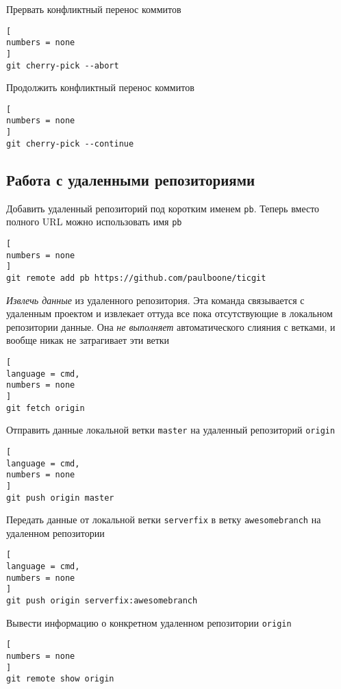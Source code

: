 \documentclass[%
	11pt,
	a4paper,
	utf8,
		]{article}
\begin{document}
Прервать конфликтный перенос коммитов
\begin{lstlisting}[
numbers = none
]
git cherry-pick --abort
\end{lstlisting}

Продолжить конфликтный перенос коммитов
\begin{lstlisting}[
numbers = none
]
git cherry-pick --continue
\end{lstlisting}


\subsection{Работа с удаленными репозиториями}

Добавить удаленный репозиторий под коротким именем \texttt{pb}. Теперь вместо полного URL можно использовать имя \texttt{pb}

\begin{lstlisting}[
numbers = none
]
git remote add pb https://github.com/paulboone/ticgit
\end{lstlisting}


\emph{Извлечь данные} из удаленного репозитория. Эта команда связывается с удаленным проектом и извлекает оттуда все пока отсутствующие в локальном репозитории данные. Она \emph{\color{red}не выполняет} автоматического слияния с ветками, и вообще никак не затрагивает эти ветки

\begin{lstlisting}[
language = cmd,
numbers = none
]
git fetch origin
\end{lstlisting}


Отправить данные локальной ветки \texttt{master} на удаленный репозиторий \texttt{origin}

\begin{lstlisting}[
language = cmd,
numbers = none
]
git push origin master
\end{lstlisting}


Передать данные от локальной ветки \texttt{serverfix} в ветку \texttt{awesomebranch} на удаленном репозитории

\begin{lstlisting}[
language = cmd,
numbers = none
]
git push origin serverfix:awesomebranch
\end{lstlisting}

Вывести информацию о конкретном удаленном репозитории \texttt{origin}

\begin{lstlisting}[
numbers = none
]
git remote show origin
\end{lstlisting}
\end{document}
